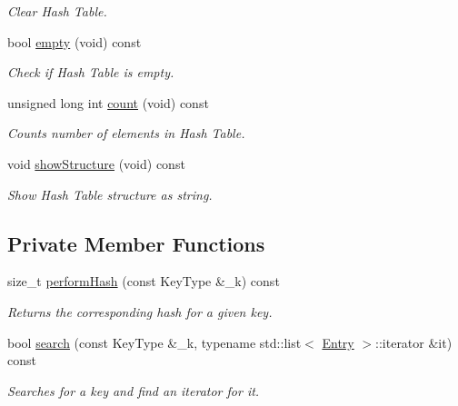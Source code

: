 \begin{DoxyCompactItemize}
\begin{DoxyCompactList}\small\item\em Clear Hash Table. \end{DoxyCompactList}\item 
bool \hyperlink{classHashTbl_a4b08659c427a7d4237fabb7cd4cbc08e}{empty} (void) const 
\begin{DoxyCompactList}\small\item\em Check if Hash Table is empty. \end{DoxyCompactList}\item 
unsigned long int \hyperlink{classHashTbl_ac9c7304090665f19d299ab52a09a3128}{count} (void) const 
\begin{DoxyCompactList}\small\item\em Counts number of elements in Hash Table. \end{DoxyCompactList}\item 
void \hyperlink{classHashTbl_adddc2a770b4dafcb325b3c194fcdc530}{show\+Structure} (void) const \hypertarget{classHashTbl_adddc2a770b4dafcb325b3c194fcdc530}{}\label{classHashTbl_adddc2a770b4dafcb325b3c194fcdc530}

\begin{DoxyCompactList}\small\item\em Show Hash Table structure as string. \end{DoxyCompactList}\end{DoxyCompactItemize}
\subsection*{Private Member Functions}
\begin{DoxyCompactItemize}
\item 
size\+\_\+t \hyperlink{classHashTbl_aa443e901cb35e81c1598644e41a10abb}{perform\+Hash} (const Key\+Type \&\+\_\+k) const 
\begin{DoxyCompactList}\small\item\em Returns the corresponding hash for a given key. \end{DoxyCompactList}\item 
bool \hyperlink{classHashTbl_aa388ae1ee1700c65b04e7b0f9df0fa66}{search} (const Key\+Type \&\+\_\+k, typename std\+::list$<$ \hyperlink{classHashEntry}{Entry} $>$\+::iterator \&it) const 
\begin{DoxyCompactList}\small\item\em Searches for a key and find an iterator for it. \end{DoxyCompactList}\end{DoxyCompactItemize}
